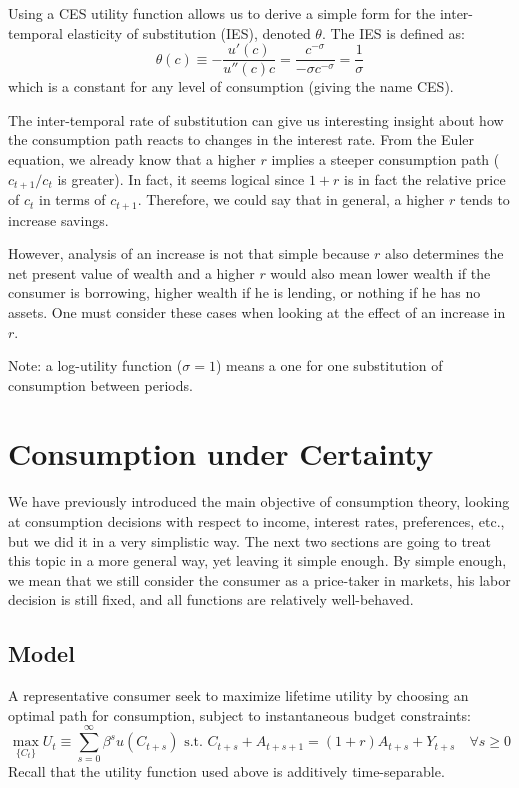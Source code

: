 \documentclass[12pt]{report}
\begin{document}
Using a CES utility function allows us to derive a simple form for the inter-temporal elasticity of substitution (IES), denoted $\theta$. The IES is defined as: $$\theta(c) \equiv -\frac{u'(c)}{u''(c)c} = \frac{c^{-\sigma}}{-\sigma c^{-\sigma}} = \frac{1}{\sigma}$$ which is a constant for any level of consumption (giving the name CES).

The inter-temporal rate of substitution can give us interesting insight about how the consumption path reacts to changes in the interest rate. From the Euler equation, we already know that a higher $r$ implies a steeper consumption path ($c_{t+1}/c_t$ is greater). In fact, it seems logical since $1+r$ is in fact the relative price of $c_t$ in terms of $c_{t+1}$. Therefore, we could say that in general, a higher $r$ tends to increase savings.

However, analysis of an increase is not that simple because $r$ also determines the net present value of wealth and a higher $r$ would also mean lower wealth if the consumer is borrowing, higher wealth if he is lending, or nothing if he has no assets. One must consider these cases when looking at the effect of an increase in $r$.

Note: a log-utility function ($\sigma = 1$) means a one for one substitution of consumption between periods.

\section{Consumption under Certainty}

We have previously introduced the main objective of consumption theory, looking at consumption decisions with respect to income, interest rates, preferences, etc., but we did it in a very simplistic way. The next two sections are going to treat this topic in a more general way, yet leaving it simple enough. By simple enough, we mean that we still consider the consumer as a price-taker in markets, his labor decision is still fixed, and all functions are relatively well-behaved.

\subsection{Model}

A representative consumer seek to maximize lifetime utility by choosing an optimal path for consumption, subject to instantaneous budget constraints: $$\max_{\{C_t\}} U_t \equiv \sum_{s=0}^{\infty} \beta^{s} u(C_{t+s}) \text{ s.t. } C_{t+s} + A_{t+s+1} = (1+r)A_{t+s} + Y_{t+s} \quad \forall s \geq 0 $$ Recall that the utility function used above is additively time-separable.
\end{document}
